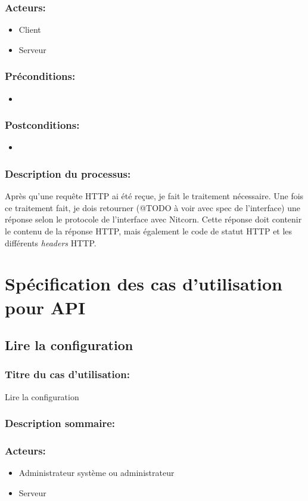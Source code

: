 \documentclass{scrreprt}
\begin{document}
\subsubsection{Acteurs:}
\begin{itemize}
    \item Client
    \item Serveur
\end{itemize}
\subsubsection{Préconditions:}
\begin{itemize}
    \item  
\end{itemize} 
\subsubsection{Postconditions:}
\begin{itemize}
    \item  
\end{itemize} 
\subsubsection{Description du processus:}Après qu'une requête HTTP ai été reçue, je fait le traitement nécessaire.
Une fois ce traitement fait, je dois retourner (@TODO à voir avec spec de l'interface)
une réponse selon le protocole de l'interface avec Nitcorn. Cette réponse doit
contenir le contenu de la réponse HTTP, mais également le code de statut HTTP
et les différents \textit{headers} HTTP.

\section{Spécification des cas d'utilisation pour API}
\subsection{Lire la configuration}
\subsubsection{Titre du cas d'utilisation:} Lire la configuration
\subsubsection{Description sommaire:}
\subsubsection{Acteurs:}
\begin{itemize}
	\item Administrateur système ou administrateur
    \item Serveur
\end{itemize}
\end{document}
